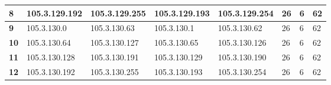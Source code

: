 \begin{table}[H]
\begin{tabular}{@{}|l|l|l|l|l|l|l|l|@{}}
\textbf{8}               & 105.3.129.192                          & 105.3.129.255                                                                       & 105.3.129.193                                                                       & 105.3.129.254                                                                      & 26                                                           & 6                                                              & 62                                                             \\ \midrule
\textbf{9}               & 105.3.130.0                            & 105.3.130.63                                                                        & 105.3.130.1                                                                         & 105.3.130.62                                                                       & 26                                                           & 6                                                              & 62                                                             \\ \midrule
\textbf{10}              & 105.3.130.64                           & 105.3.130.127                                                                       & 105.3.130.65                                                                        & 105.3.130.126                                                                      & 26                                                           & 6                                                              & 62                                                             \\ \midrule
\textbf{11}              & 105.3.130.128                          & 105.3.130.191                                                                       & 105.3.130.129                                                                       & 105.3.130.190                                                                      & 26                                                           & 6                                                              & 62                                                             \\ \midrule
\textbf{12}              & 105.3.130.192                          & 105.3.130.255                                                                       & 105.3.130.193                                                                       & 105.3.130.254                                                                      & 26                                                           & 6                                                              & 62                                                             \\ \midrule

\end{tabular}
\end{table}
